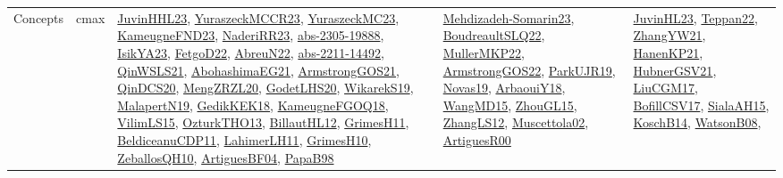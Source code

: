 {\begin{longtable}{lp{3cm}>{\raggedright}p{6cm}>{\raggedright}p{6cm}p{8cm}}
Concepts & cmax & \href{papers/JuvinHHL23.pdf}{JuvinHHL23}\cite{JuvinHHL23}, \href{articles/YuraszeckMCCR23.pdf}{YuraszeckMCCR23}\cite{YuraszeckMCCR23}, \href{papers/YuraszeckMC23.pdf}{YuraszeckMC23}\cite{YuraszeckMC23}, \href{papers/KameugneFND23.pdf}{KameugneFND23}\cite{KameugneFND23}, \href{articles/NaderiRR23.pdf}{NaderiRR23}\cite{NaderiRR23}, \href{articles/abs-2305-19888.pdf}{abs-2305-19888}\cite{abs-2305-19888}, \href{articles/IsikYA23.pdf}{IsikYA23}\cite{IsikYA23}, \href{articles/FetgoD22.pdf}{FetgoD22}\cite{FetgoD22}, \href{articles/AbreuN22.pdf}{AbreuN22}\cite{AbreuN22}, \href{articles/abs-2211-14492.pdf}{abs-2211-14492}\cite{abs-2211-14492}, \href{articles/QinWSLS21.pdf}{QinWSLS21}\cite{QinWSLS21}, \href{articles/AbohashimaEG21.pdf}{AbohashimaEG21}\cite{AbohashimaEG21}, \href{papers/ArmstrongGOS21.pdf}{ArmstrongGOS21}\cite{ArmstrongGOS21}, \href{articles/QinDCS20.pdf}{QinDCS20}\cite{QinDCS20}, \href{articles/MengZRZL20.pdf}{MengZRZL20}\cite{MengZRZL20}, \href{papers/GodetLHS20.pdf}{GodetLHS20}\cite{GodetLHS20}, \href{articles/WikarekS19.pdf}{WikarekS19}\cite{WikarekS19}, \href{papers/MalapertN19.pdf}{MalapertN19}\cite{MalapertN19}, \href{articles/GedikKEK18.pdf}{GedikKEK18}\cite{GedikKEK18}, \href{papers/KameugneFGOQ18.pdf}{KameugneFGOQ18}\cite{KameugneFGOQ18}, \href{papers/VilimLS15.pdf}{VilimLS15}\cite{VilimLS15}, \href{articles/OzturkTHO13.pdf}{OzturkTHO13}\cite{OzturkTHO13}, \href{papers/BillautHL12.pdf}{BillautHL12}\cite{BillautHL12}, \href{papers/GrimesH11.pdf}{GrimesH11}\cite{GrimesH11}, \href{articles/BeldiceanuCDP11.pdf}{BeldiceanuCDP11}\cite{BeldiceanuCDP11}, \href{papers/LahimerLH11.pdf}{LahimerLH11}\cite{LahimerLH11}, \href{papers/GrimesH10.pdf}{GrimesH10}\cite{GrimesH10}, \href{articles/ZeballosQH10.pdf}{ZeballosQH10}\cite{ZeballosQH10}, \href{papers/ArtiguesBF04.pdf}{ArtiguesBF04}\cite{ArtiguesBF04}, \href{articles/PapaB98.pdf}{PapaB98}\cite{PapaB98} & \href{papers/Mehdizadeh-Somarin23.pdf}{Mehdizadeh-Somarin23}\cite{Mehdizadeh-Somarin23}, \href{papers/BoudreaultSLQ22.pdf}{BoudreaultSLQ22}\cite{BoudreaultSLQ22}, \href{articles/MullerMKP22.pdf}{MullerMKP22}\cite{MullerMKP22}, \href{papers/ArmstrongGOS22.pdf}{ArmstrongGOS22}\cite{ArmstrongGOS22}, \href{papers/ParkUJR19.pdf}{ParkUJR19}\cite{ParkUJR19}, \href{articles/Novas19.pdf}{Novas19}\cite{Novas19}, \href{papers/ArbaouiY18.pdf}{ArbaouiY18}\cite{ArbaouiY18}, \href{articles/WangMD15.pdf}{WangMD15}\cite{WangMD15}, \href{papers/ZhouGL15.pdf}{ZhouGL15}\cite{ZhouGL15}, \href{papers/ZhangLS12.pdf}{ZhangLS12}\cite{ZhangLS12}, \href{papers/Muscettola02.pdf}{Muscettola02}\cite{Muscettola02}, \href{articles/ArtiguesR00.pdf}{ArtiguesR00}\cite{ArtiguesR00} & \href{papers/JuvinHL23.pdf}{JuvinHL23}\cite{JuvinHL23}, \href{papers/Teppan22.pdf}{Teppan22}\cite{Teppan22}, \href{articles/ZhangYW21.pdf}{ZhangYW21}\cite{ZhangYW21}, \href{papers/HanenKP21.pdf}{HanenKP21}\cite{HanenKP21}, \href{articles/HubnerGSV21.pdf}{HubnerGSV21}\cite{HubnerGSV21}, \href{papers/LiuCGM17.pdf}{LiuCGM17}\cite{LiuCGM17}, \href{papers/BofillCSV17.pdf}{BofillCSV17}\cite{BofillCSV17}, \href{papers/SialaAH15.pdf}{SialaAH15}\cite{SialaAH15}, \href{papers/KoschB14.pdf}{KoschB14}\cite{KoschB14}, \href{papers/WatsonB08.pdf}{WatsonB08}\cite{WatsonB08}, 
\end{longtable}}

